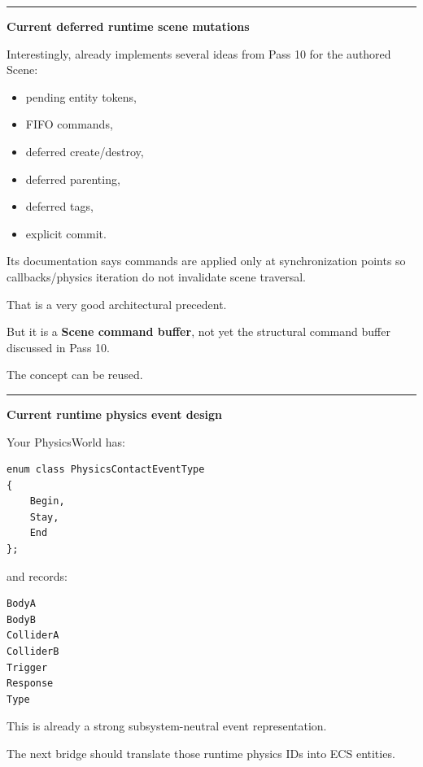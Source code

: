 \begin{center}\rule{0.5\linewidth}{0.5pt}\end{center}

\textbf{Current deferred runtime scene mutations}

Interestingly,  already implements several ideas from Pass 10 for the authored Scene:

\begin{itemize}
\tightlist
\item
  pending entity tokens,
\item
  FIFO commands,
\item
  deferred create/destroy,
\item
  deferred parenting,
\item
  deferred tags,
\item
  explicit commit.
\end{itemize}

Its documentation says commands are applied only at synchronization points so callbacks/physics iteration do not invalidate scene traversal.

That is a very good architectural precedent.

But it is a \textbf{Scene command buffer}, not yet the  structural command buffer discussed in Pass 10.

The concept can be reused.

\begin{center}\rule{0.5\linewidth}{0.5pt}\end{center}

\textbf{Current runtime physics event design}

Your PhysicsWorld has:

\begin{verbatim}
enum class PhysicsContactEventType
{
    Begin,
    Stay,
    End
};
\end{verbatim}

and records:

\begin{verbatim}
BodyA
BodyB
ColliderA
ColliderB
Trigger
Response
Type
\end{verbatim}

This is already a strong subsystem-neutral event representation.

The next bridge should translate those runtime physics IDs into ECS entities.

